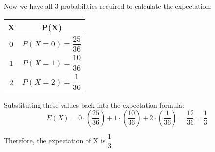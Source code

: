 \documentclass[journal,12pt,twocolumn]{IEEEtran}
\begin{document}
\noindent Now we have all 3 probabilities required to calculate the expectation:

\begin{table}[!htbp]
    \centering
    \begin{tabular}{|c|c|}
    \hline
    X & P(X) \\
    \hline
    \hline
    0 & $P(X = 0) = \dfrac{25}{36}$ \\
    \hline
    1 & $P(X = 1) = \dfrac{10}{36}$ \\
    \hline
    2 & $P(X = 2) = \dfrac{1}{36}$ \\
    \hline

    \end{tabular}
    \end{table}


\noindent Substituting these values back into the expectation formula:
\[ E(X) = 0 \cdot \left(\frac{25}{36}\right) + 1 \cdot \left(\frac{10}{36}\right) + 2 \cdot \left(\frac{1}{36}\right) = \frac{12}{36} = \frac{1}{3} \]

Therefore, the expectation of X is ${\dfrac{1}{3}}$
\end{document}
